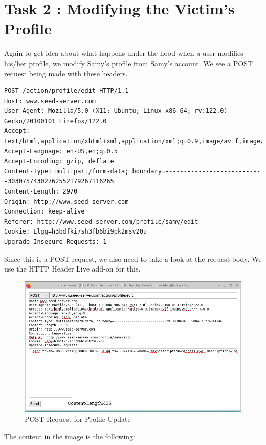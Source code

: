 \documentclass[12pt]{article}
\begin{document}
\newpage


\section*{Task 2 : Modifying the Victim’s Profile}
Again to get idea about what happens under the hood when a user modifies his/her profile, we modify Samy's profile from Samy's account. We see a POST request being made with these headers.

\begin{verbatim}
POST /action/profile/edit HTTP/1.1
Host: www.seed-server.com
User-Agent: Mozilla/5.0 (X11; Ubuntu; Linux x86_64; rv:122.0) Gecko/20100101 Firefox/122.0
Accept: text/html,application/xhtml+xml,application/xml;q=0.9,image/avif,image/webp,*/*;q=0.8
Accept-Language: en-US,en;q=0.5
Accept-Encoding: gzip, deflate
Content-Type: multipart/form-data; boundary=---------------------------30307574302762552179267116265
Content-Length: 2970
Origin: http://www.seed-server.com
Connection: keep-alive
Referer: http://www.seed-server.com/profile/samy/edit
Cookie: Elgg=h3bdfki7sh3fb6bi9pk2msv20u
Upgrade-Insecure-Requests: 1
\end{verbatim}

Since this is a POST request, we also need to take a look at the request body. We use the HTTP Header Live add-on for this.

     \begin{figure}[H]
         \centering
         \includegraphics[width=\textwidth]{Images/ss2.png}
         \caption{POST Request for Profile Update}
         \label{fig:ss2}
     \end{figure}

The content in the image is the following:
\end{document}
